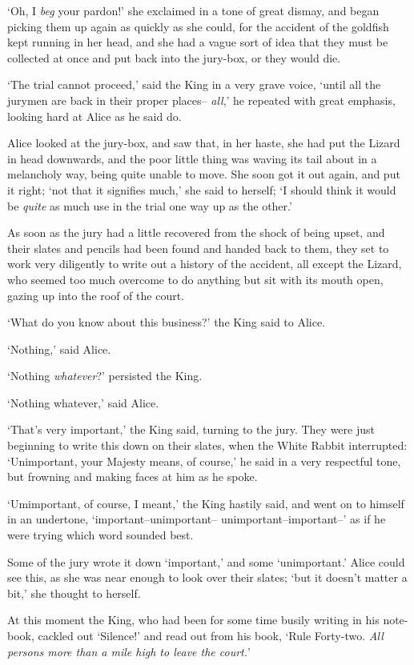   `Oh, I {\it beg} your pardon!' she exclaimed in a tone of great
dismay, and began picking them up again as quickly as she could,
for the accident of the goldfish kept running in her head, and
she had a vague sort of idea that they must be collected at once
and put back into the jury-box, or they would die.

  `The trial cannot proceed,' said the King in a very grave
voice, `until all the jurymen are back in their proper places--
{\it all},' he repeated with great emphasis, looking hard at Alice as
he said do.

  Alice looked at the jury-box, and saw that, in her haste, she
had put the Lizard in head downwards, and the poor little thing
was waving its tail about in a melancholy way, being quite unable
to move.  She soon got it out again, and put it right; `not that
it signifies much,' she said to herself; `I should think it
would be {\it quite} as much use in the trial one way up as the other.'

  As soon as the jury had a little recovered from the shock of
being upset, and their slates and pencils had been found and
handed back to them, they set to work very diligently to write
out a history of the accident, all except the Lizard, who seemed
too much overcome to do anything but sit with its mouth open,
gazing up into the roof of the court.

  `What do you know about this business?' the King said to
Alice.

  `Nothing,' said Alice.

  `Nothing {\it whatever}?' persisted the King.

  `Nothing whatever,' said Alice.

  `That's very important,' the King said, turning to the jury.
They were just beginning to write this down on their slates, when
the White Rabbit interrupted:  `Unimportant, your Majesty means,
of course,' he said in a very respectful tone, but frowning and
making faces at him as he spoke.

  `Umimportant, of course, I meant,' the King hastily said, and
went on to himself in an undertone, `important--unimportant--
unimportant--important--' as if he were trying which word
sounded best.

  Some of the jury wrote it down `important,' and some
`unimportant.'  Alice could see this, as she was near enough to
look over their slates; `but it doesn't matter a bit,' she
thought to herself.

  At this moment the King, who had been for some time busily
writing in his note-book, cackled out `Silence!' and read out
from his book, `Rule Forty-two. {\it All persons more than
a mile high to leave the court.}'

